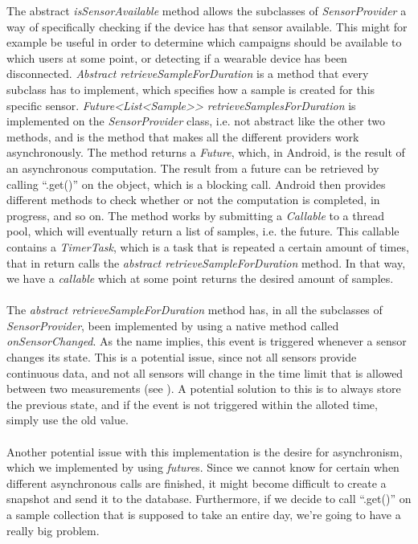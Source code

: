 The abstract \emph{isSensorAvailable} method allows the subclasses of \emph{SensorProvider} a way of specifically checking if the device has that sensor available. This might for example be useful in order to determine which campaigns should be available to which users at some point, or detecting if a wearable device has been disconnected. \emph{Abstract retrieveSampleForDuration} is a method that every subclass has to implement, which specifies how a sample is created for this specific sensor. \emph{Future<List<Sample>> retrieveSamplesForDuration} is implemented on the \emph{SensorProvider} class, i.e. not abstract like the other two methods, and is the method that makes all the different providers work asynchronously. The method returns a \emph{Future}, which, in Android, is the result of an asynchronous computation. The result from a future can be retrieved by calling ``.get()'' on the object, which is a blocking call. Android then provides different methods to check whether or not the computation is completed, in progress, and so on. The method works by submitting a \emph{Callable} to a thread pool, which will eventually return a list of samples, i.e. the future. This callable contains a \emph{TimerTask}, which is a task that is repeated a certain amount of times, that in return calls the \emph{abstract retrieveSampleForDuration} method. In that way, we have a \emph{callable} which at some point returns the desired amount of samples. 
\\\\
The \emph{abstract retrieveSampleForDuration} method has, in all the subclasses of \emph{SensorProvider}, been implemented by using a native method called \emph{onSensorChanged}. As the name implies, this event is triggered whenever a sensor changes its state. This is a potential issue, since not all sensors provide continuous data, and not all sensors will change in the time limit that is allowed between two measurements (see ). A potential solution to this is to always store the previous state, and if the event is not triggered within the alloted time, simply use the old value. 
\\\\
Another potential issue with this implementation is the desire for asynchronism, which we implemented by using \emph{future}s. Since we cannot know for certain when different asynchronous calls are finished, it might become difficult to create a snapshot and send it to the database. Furthermore, if we decide to call ``.get()'' on a sample collection that is supposed to take an entire day, we're going to have a really big problem. 

% 